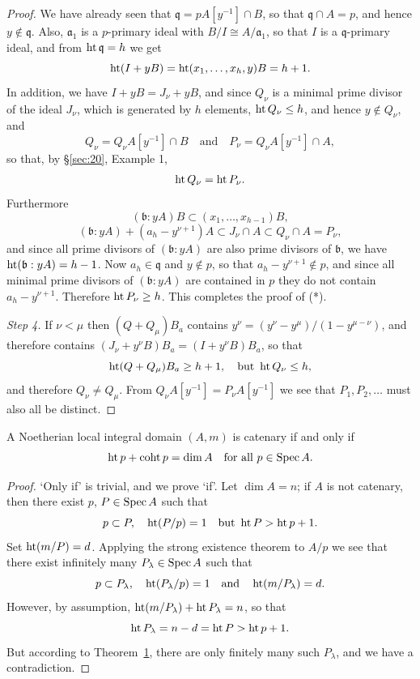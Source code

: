 \begin{proof}
We have already seen that $\mathfrak{q} = pA[y^{-1}] \cap B$, so that
$\mathfrak{q} \cap A = p$, and hence $y \notin \mathfrak{q}$. Also, $\mathfrak{a}_1$ is a $p$-primary ideal
with $B/I \cong A/\mathfrak{a}_1$, so that $I$ is a $\mathfrak{q}$-primary ideal, and from
$\operatorname{ht} \mathfrak{q} = h$ we get
\[
  \operatorname{ht}(I + yB) = \operatorname{ht}(x_1, \ldots, x_h, y)B = h + 1.
\]
In addition, we have $I + yB = J_\nu + yB$, and since $Q_\nu$ is a minimal prime
divisor of the ideal $J_\nu$, which is generated by $h$ elements,
$\operatorname{ht} Q_\nu \le h$, and hence $y \notin Q_\nu$, and
\[
  Q_\nu = Q_\nu A[y^{-1}] \cap B \quad \text{and} \quad P_\nu = Q_\nu A[y^{-1}] \cap A,
\]
so that, by \S\ref{sec:20}, Example 1,
\[
  \operatorname{ht} Q_\nu = \operatorname{ht} P_\nu.
\]
Furthermore
\[
  (\mathfrak{b} : yA)B \subset (x_1, \ldots, x_{h-1})B,
\]
\[
  (\mathfrak{b} : yA) + (a_h - y^{\nu+1})A \subset J_\nu \cap A \subset Q_\nu \cap A = P_\nu,
\]
and since all prime divisors of $(\mathfrak{b} : yA)$ are also prime divisors of
$\mathfrak{b}$, we have $\operatorname{ht}(\mathfrak{b} : yA) = h - 1$. Now $a_h \in \mathfrak{q}$ and
$y \notin p$, so that $a_h - y^{\nu+1} \notin p$, and since all minimal prime divisors of
$(\mathfrak{b} : yA)$ are contained in $p$ they do not contain $a_h - y^{\nu+1}$.
Therefore $\operatorname{ht} P_\nu \ge h$. This completes the proof of (*).

\textit{Step 4.} If $\nu < \mu$ then $(Q + Q_\mu)B_a$ contains $y^\nu = (y^\nu - y^\mu)/(1 - y^{\mu-\nu})$,
and therefore contains $(J_\nu + y^\nu B)B_a = (I + y^\nu B)B_a$, so that
\[
  \operatorname{ht}(Q + Q_\mu)B_a \ge h + 1, \quad \text{but } \operatorname{ht} Q_\nu \le h,
\]
and therefore $Q_\nu \ne Q_\mu$. From $Q_\nu A[y^{-1}] = P_\nu A[y^{-1}]$ we see that
$P_1, P_2, \ldots$ must also all be distinct.
\end{proof}

\begin{theorem}\label{thm:31.4}
A Noetherian local integral domain $(A, m)$ is catenary if and only if
\[
  \operatorname{ht} p + \operatorname{coht} p = \dim A \quad \text{for all } p \in \operatorname{Spec} A.
\]
\end{theorem}

\begin{proof}
`Only if' is trivial, and we prove `if'. Let $\dim A = n$; if $A$ is not catenary, then
there exist $p$, $P \in \operatorname{Spec} A$ such that
\[
  p \subset P, \quad \operatorname{ht}(P/p) = 1 \quad \text{but } \operatorname{ht} P > \operatorname{ht} p + 1.
\]
Set $\operatorname{ht}(m/P) = d$. Applying the strong existence theorem to $A/p$ we see that there
exist infinitely many $P_\lambda \in \operatorname{Spec} A$ such that
\[
  p \subset P_\lambda, \quad \operatorname{ht}(P_\lambda/p) = 1 \quad \text{and} \quad \operatorname{ht}(m/P_\lambda) = d.
\]
However, by assumption, $\operatorname{ht}(m/P_\lambda) + \operatorname{ht} P_\lambda = n$, so that
\[
  \operatorname{ht} P_\lambda = n - d = \operatorname{ht} P > \operatorname{ht} p + 1.
\]
But according to Theorem~\hyperref[thm:31.1]{1}, there are only finitely many such
$P_\lambda$, and we have a contradiction.
\end{proof}

